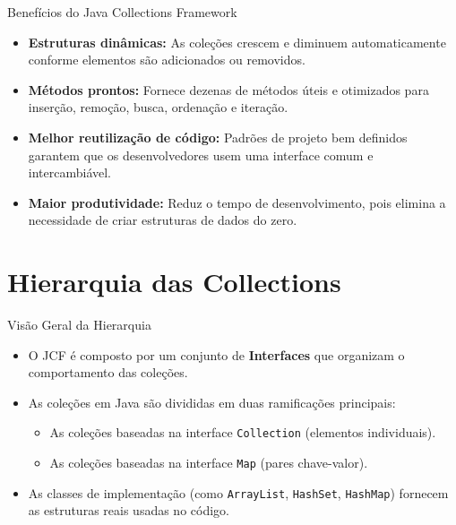 \documentclass[9pt]{beamer}
\begin{document}
\begin{frame}{Benefícios do Java Collections Framework}
    \begin{itemize}
        \item \textbf{Estruturas dinâmicas:} As coleções crescem e diminuem automaticamente conforme elementos são adicionados ou removidos.
        \item \textbf{Métodos prontos:} Fornece dezenas de métodos úteis e otimizados para inserção, remoção, busca, ordenação e iteração.
        \item \textbf{Melhor reutilização de código:} Padrões de projeto bem definidos garantem que os desenvolvedores usem uma interface comum e intercambiável.
        \item \textbf{Maior produtividade:} Reduz o tempo de desenvolvimento, pois elimina a necessidade de criar estruturas de dados do zero.
    \end{itemize}
\end{frame}

\section{Hierarquia das Collections}

\begin{frame}{Visão Geral da Hierarquia}
    \begin{itemize}
        \item O JCF é composto por um conjunto de \textbf{Interfaces} que organizam o comportamento das coleções.
        \item As coleções em Java são divididas em duas ramificações principais:
        \begin{itemize}
            \item As coleções baseadas na interface \texttt{Collection} (elementos individuais).
            \item As coleções baseadas na interface \texttt{Map} (pares chave-valor).
        \end{itemize}
        \item As classes de implementação (como \texttt{ArrayList}, \texttt{HashSet}, \texttt{HashMap}) fornecem as estruturas reais usadas no código.
    \end{itemize}
\end{frame}
\end{document}
